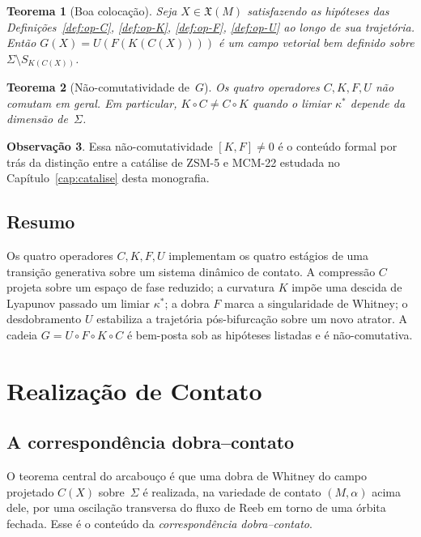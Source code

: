 \documentclass[12pt,a4paper,twoside]{book}
\theoremstyle{plain}
\newtheorem{teorema}{Teorema}[section]
\theoremstyle{definition}
\theoremstyle{definition}
\newtheorem{observacao}[teorema]{Observação}
\begin{document}
\begin{teorema}[Boa colocação]\label{thm:cadeia-bem-posta}
Seja $X \in \mathfrak{X}(M)$ satisfazendo as hipóteses das
Definições~\ref{def:op-C}, \ref{def:op-K}, \ref{def:op-F}, \ref{def:op-U}
ao longo de sua trajetória. Então $G(X) = U(F(K(C(X))))$ é um campo
vetorial bem definido sobre $\Sigma \setminus S_{K(C(X))}$.
\end{teorema}

\begin{teorema}[Não-comutatividade de~$G$]\label{thm:cadeia-nao-comuta}
Os quatro operadores $C, K, F, U$ não comutam em geral. Em particular,
$K \circ C \ne C \circ K$ quando o limiar $\kappa^{\ast}$ depende da
dimensão de~$\Sigma$.
\end{teorema}

\begin{observacao}
Essa não-comutatividade $[K, F] \ne 0$ é o conteúdo formal por trás da
distinção entre a catálise de ZSM-5 e MCM-22 estudada no
Capítulo~\ref{cap:catalise} desta monografia.
\end{observacao}

\section{Resumo}

Os quatro operadores $C, K, F, U$ implementam os quatro estágios de uma
transição generativa sobre um sistema dinâmico de contato. A compressão
$C$ projeta sobre um espaço de fase reduzido; a curvatura $K$ impõe uma
descida de Lyapunov passado um limiar $\kappa^{\ast}$; a dobra $F$ marca
a singularidade de Whitney; o desdobramento $U$ estabiliza a trajetória
pós-bifurcação sobre um novo atrator. A cadeia
$G = U \circ F \circ K \circ C$ é bem-posta sob as hipóteses listadas
e é não-comutativa.

\chapter{Realização de Contato}
\label{cap:realizacao}

\section{A correspondência dobra--contato}

O teorema central do arcabouço é que uma dobra de Whitney do campo
projetado $C(X)$ sobre~$\Sigma$ é realizada, na variedade de contato
$(M,\alpha)$ acima dele, por uma oscilação transversa do fluxo de Reeb
em torno de uma órbita fechada. Esse é o conteúdo da \emph{correspondência
dobra--contato}.
\end{document}
